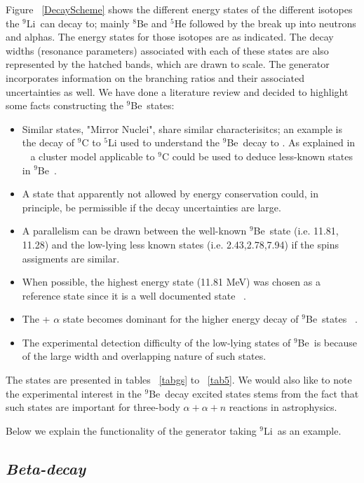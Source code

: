 \documentclass{JINST}
\newcommand{\li}{$^{9}$Li~}
\newcommand{\beNINE}{$^{9}$Be~}
\begin{document}
Figure ~\ref{DecayScheme} shows the different energy states of the different
isotopes the \li can decay to; mainly $^8$Be and $^5$He followed by the break up
into neutrons and alphas. The energy states for those isotopes are as indicated.
The decay widths (resonance parameters) associated with each of these states are
also represented by the hatched bands, which are drawn to scale. The generator
incorporates information on the branching ratios and their associated
uncertainties as well. We have done a literature review and decided to highlight some facts constructing the \beNINE states:
\begin{itemize}
 \item  Similar states, "Mirror Nuclei", share similar characterisitcs; an example is the decay of $^{9}$C to $^{5}$Li used 
 to understand the \beNINE decay to \heFIVE. As explained in ~\cite{PhysRevC.75.045803} a cluster model applicable to $^{9}$C could be used to deduce less-known
 states in \beNINE.
 \item A state that apparently not allowed by energy conservation could, in principle, be permissible 
 if the decay uncertainties are large.
 \item A parallelism can be drawn between the well-known \beNINE state (i.e. 11.81, 11.28) and the low-lying less known states 
 (i.e. 2.43,2.78,7.94) if the spins assigments are similar.
 \item When possible, the highest energy state (11.81 MeV) was chosen as a reference state since it is a well documented state ~\cite{Prezado200355}.
 \item The \heFIVE + $\alpha$ state becomes dominant for the higher energy decay of \beNINE states ~\cite{Descouv}. 
 \item The experimental detection difficulty of the low-lying states of \beNINE is because of the large width and overlapping nature of such states.
 
 
\end{itemize}


The states are presented in tables ~\ref{tabgs} to ~\ref{tab5}. We would also like to note the experimental interest in the \beNINE decay excited states stems from the fact that such states are important for three-body 
$ \alpha + \alpha +n $ reactions in astrophysics.

Below we explain the functionality of the generator taking \li as an example.

\subsection*{\it Beta-decay}
\end{document}
